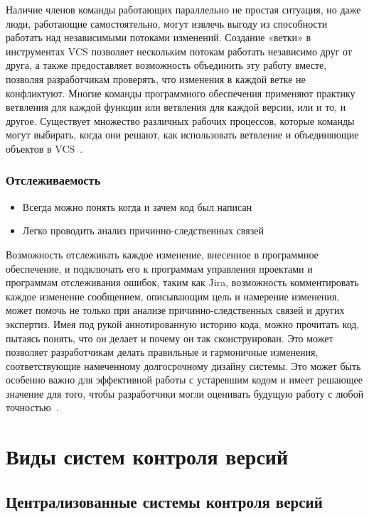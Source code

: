\documentclass{../industrial-development}
\begin{document}
\lecturenotes

Наличие членов команды работающих параллельно не простая ситуация, но даже люди, работающие самостоятельно, могут извлечь выгоду из способности работать над независимыми потоками изменений. Создание «ветки» в инструментах VCS позволяет нескольким потокам работать независимо друг от друга, а также предоставляет возможность объединить эту работу вместе, позволяя разработчикам проверять, что изменения в каждой ветке не конфликтуют. Многие команды программного обеспечения применяют практику ветвления для каждой функции или ветвления для каждой версии, или и то, и другое. Существует множество различных рабочих процессов, которые команды могут выбирать, когда они решают, как использовать ветвление и объединяющие объектов в VCS~\cite{Atlassian}.

\begin{frame} \frametitle{Отслеживаемость}
 
  \begin{itemize}
  \item Всегда можно понять когда и зачем код был написан
  \item Легко проводить анализ причинно-следственных связей
  \end{itemize}
\end{frame}

\lecturenotes

Возможность отслеживать каждое изменение, внесенное в программное обеспечение, и подключать его к программам управления проектами и программам отслеживания ошибок, таким как Jira, возможность комментировать каждое изменение сообщением, описывающим цель и намерение изменения, может помочь не только при анализе причинно-следственных связей и других экспертиз. Имея под рукой аннотированную историю кода, можно прочитать код, пытаясь понять, что он делает и почему он так сконструирован. Это может позволяет разработчикам делать правильные и гармоничные изменения, соответствующие намеченному долгосрочному дизайну системы. Это может быть особенно важно для эффективной работы с устаревшим кодом и имеет решающее значение для того, чтобы разработчики могли оценивать будущую работу с любой точностью~\cite{Atlassian}.

\section{Виды систем контроля версий}

\subsection{Централизованные системы контроля версий}
\end{document}
